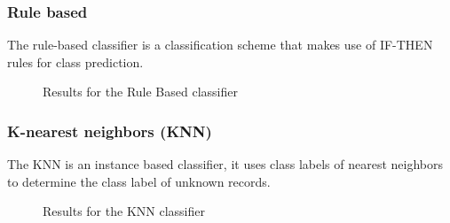 \subsubsection{Rule based}
The rule-based classifier is a classification scheme that makes use of IF-THEN rules for class prediction. 
\begin{figure}[H]
    \centering
    \caption{Results for the Rule Based classifier}
    \label{fig:RBResults}
\end{figure}

\subsubsection{K-nearest neighbors (KNN)}
The KNN is an instance based classifier, it uses class labels of nearest neighbors to determine the class label of unknown records.
\begin{figure}[H]
    \centering
    \caption{Results for the KNN classifier}
    \label{fig:KNNResults}
\end{figure}

